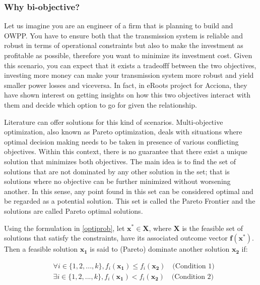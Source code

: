\documentclass[a4paper,11pt, titlepage, twoside]{article}
\begin{document}
\subsubsection{Why bi-objective?} \label{biobjective}

Let us imagine you are an engineer of a firm that is planning to build and OWPP. You have to ensure both that the transmission system is reliable and robust in terms of operational constraints but also to make the
investment as profitable as possible, therefore you want to minimize its investment cost. Given this scenario, you can expect that it exists a tradeofff between the two objectives, investing more money can make your transmission system more robust and yield smaller power losses and
viceversa. In fact, in eRoots project for Acciona, they have shown interest on getting insights on how this two objectives interact with them and decide which option to go for given the relationship.\par

Literature can offer solutions for this kind of scenarios. Multi-objective optimization, also known as Pareto optimization, deals with situations where optimal decision
making needs to be taken in presence of various conflicting objectives.  Within this context, there is no guarantee that there exist a unique solution that minimizes both objectives.
The main idea is to find the set of solutions that are not dominated by any other solution in the set; that is solutions where no objective can be further minimized without worsening another. In this sense, any point found in this set can be considered optimal 
and be regarded as a potential solution. This set is called the Pareto Frontier and the solutions are called Pareto optimal solutions.\par

Using the formulation in \ref{optiprob}, let $ \mathbf{x^*} \in \mathbf{X}$, where $\mathbf{X}$ is the feasible set of solutions that satisfy the constraints, have its associated outcome vector $\mathbf{f}(\mathbf{x^*})$.
Then a feasible solution $\mathbf{x_1}$ is said to (Pareto) dominate another solution $\mathbf{x_2}$ \cite{nsgai} if: 

\begin{equation} \label{paretodomination}
\begin{split}
    & \forall i \in \{1, 2, ..., k\}, f_i(\mathbf{x_1}) \leq f_i(\mathbf{x_2}) \quad \text{(Condition 1)} \\
    & \exists i \in \{1, 2, ..., k\}, f_i(\mathbf{x_1}) < f_i(\mathbf{x_2}) \quad \text{(Condition 2)}
\end{split}    
\end{equation}
\end{document}
